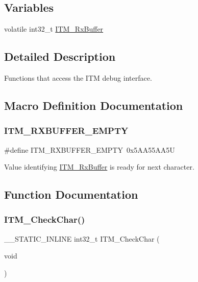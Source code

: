 \subsection*{Variables}
\begin{DoxyCompactItemize}
\item 
volatile int32\+\_\+t \mbox{\hyperlink{group__CMSIS__core__DebugFunctions_ga12e68e55a7badc271b948d6c7230b2a8}{I\+T\+M\+\_\+\+Rx\+Buffer}}
\end{DoxyCompactItemize}


\subsection{Detailed Description}
Functions that access the I\+TM debug interface. 



\subsection{Macro Definition Documentation}
\mbox{\label{group__CMSIS__core__DebugFunctions_gaa822cb398ee022b59e9e6c5d7bbb228a}} 
\subsubsection{\texorpdfstring{ITM\_RXBUFFER\_EMPTY}{ITM\_RXBUFFER\_EMPTY}}
{\footnotesize\ttfamily \#define I\+T\+M\+\_\+\+R\+X\+B\+U\+F\+F\+E\+R\+\_\+\+E\+M\+P\+TY~0x5\+A\+A55\+A\+A5U}

Value identifying \mbox{\hyperlink{group__CMSIS__core__DebugFunctions_ga12e68e55a7badc271b948d6c7230b2a8}{I\+T\+M\+\_\+\+Rx\+Buffer}} is ready for next character. 

\subsection{Function Documentation}
\mbox{\label{group__CMSIS__core__DebugFunctions_gae61ce9ca5917735325cd93b0fb21dd29}} 
\subsubsection{\texorpdfstring{ITM\_CheckChar()}{ITM\_CheckChar()}}
{\footnotesize\ttfamily \+\_\+\+\_\+\+S\+T\+A\+T\+I\+C\+\_\+\+I\+N\+L\+I\+NE int32\+\_\+t I\+T\+M\+\_\+\+Check\+Char (\begin{DoxyParamCaption}\item[{void}]{ }\end{DoxyParamCaption})}



